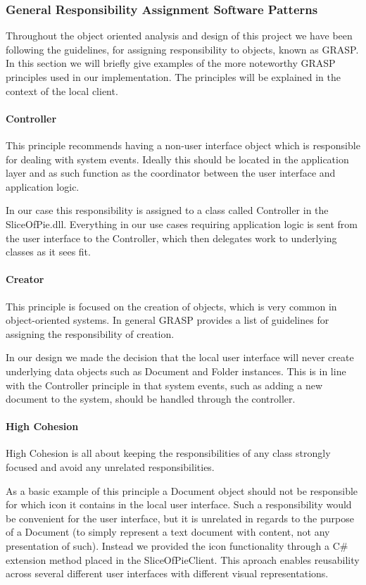 \subsubsection{General Responsibility Assignment Software Patterns}
\label{sec:GRASP}

Throughout the object oriented analysis and design of this project we have been following the guidelines, for assigning responsibility to objects,  known as GRASP.
In this section we will briefly give examples of the more noteworthy GRASP principles used in our implementation. The principles will be explained in the context of the local client.

\paragraph{Controller}
This principle recommends having a non-user interface object which is responsible for dealing with system events. Ideally this should  be located in the application layer and as such function as the coordinator between the user interface and application logic.

In our case this responsibility is assigned to a class called Controller in the SliceOfPie.dll. Everything in our use cases requiring application logic is sent from the user interface to the Controller, which then delegates work to underlying classes as it sees fit.

\paragraph{Creator}
This principle is focused on the creation of objects, which is very common in object-oriented systems. In general GRASP provides a list of guidelines for assigning the responsibility of creation.

In our design we made the decision that the local user interface will never create underlying data objects such as Document and Folder instances. This is in line with the Controller principle in that system events, such as adding a new document to the system, should be handled through the controller.

\paragraph{High Cohesion}
High Cohesion is all about keeping the responsibilities of any class strongly focused and avoid any unrelated responsibilities. 

As a basic example of this principle a Document object should not be responsible for which icon it contains in the local user interface. Such a responsibility would be convenient for the user interface, but it is unrelated in regards to the purpose of a Document (to simply represent a text document with content, not any presentation of such). Instead we provided the icon functionality through a C\# extension method placed in the SliceOfPieClient. This aproach enables reusability across several different user interfaces with different visual representations.

